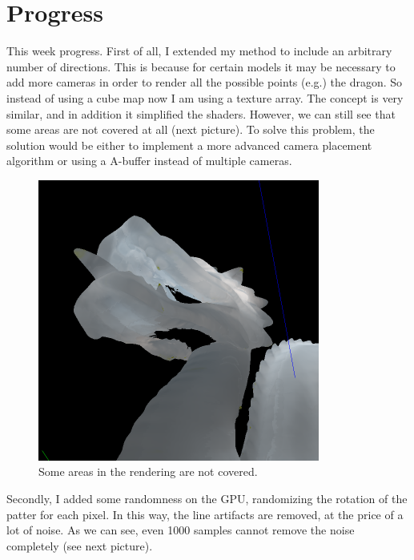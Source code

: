 \documentclass[12pt, twoside,a4paper]{article}
\begin{document}
\section{Progress}

This week progress. First of all, I extended my method to include an arbitrary number of directions. This is because for certain models it may be necessary to add more cameras in order to render all the possible points (e.g.) the dragon. So instead of using a cube map now I am using a texture array. The concept is very similar, and in addition it simplified the shaders. However, we can still see that some areas are not covered at all (next picture). To solve this problem, the solution would be either to implement a more advanced camera placement algorithm or using a A-buffer instead of multiple cameras.

\vspace{0.5cm}
\begin{figure}[!h]
\centering
\includegraphics[width=350px]{missing.png}
\caption{Some areas in the rendering are not covered.}

\end{figure}

\clearpage
Secondly, I added some randomness on the GPU, randomizing the rotation of the patter for each pixel. In this way, the line artifacts are removed, at the price of a lot of noise. As we can see, even 1000 samples cannot remove the noise completely (see next picture).
\end{document}
